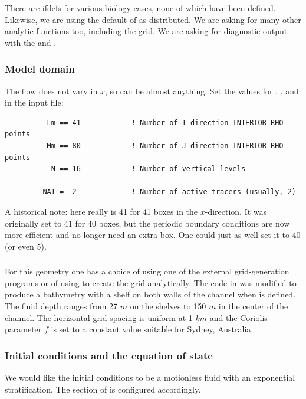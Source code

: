 There are ifdefs for various biology cases, none of which
have been defined. Likewise, we are using the default of
 as distributed. We are asking for many other
analytic functions too, including the grid. We are asking
for diagnostic output with the  and
.

\subsubsection{Model domain}
The flow does not vary in $x$, so  can be almost anything.
Set the values for , ,  and  in
the input file:
\begin{verbatim}
          Lm == 41            ! Number of I-direction INTERIOR RHO-points
          Mm == 80            ! Number of J-direction INTERIOR RHO-points
           N == 16            ! Number of vertical levels

         NAT =  2             ! Number of active tracers (usually, 2)
\end{verbatim}
A historical note:  here really is 41 for 41 boxes in the
$x$-direction. It was originally set to 41 for 40 boxes, but the
periodic boundary conditions are now more efficient and no longer
need an extra box. One could just as well set it to 40 (or even 5).

\subsubsection{}
For this geometry one has a choice of using one of the external
grid-generation programs or of using  to create the grid
analytically. The code in  was modified to produce a
bathymetry with a shelf on both walls of the channel when 
is defined. The fluid depth ranges from 27 $m$ on the shelves to 150 $m$
in the center of the channel.  The horizontal grid spacing is uniform
at 1 $km$ and the Coriolis parameter $f$ is set to a constant value
suitable for Sydney, Australia.

\subsubsection{Initial conditions and the equation of state}
We would like the initial conditions to be a motionless fluid with an
exponential stratification. The  section of
 is configured accordingly.

